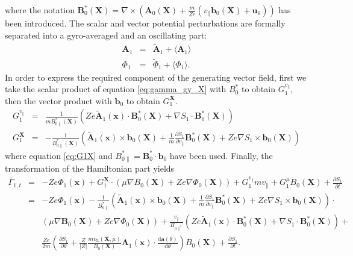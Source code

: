 \documentclass[a4paper,10pt]{article}
\newcommand{\st}[1]{\mathrm{#1}} %
\renewcommand{\vec}[1]{\mathbf{#1}}
\begin{document}
where the notation $\mathbf{B}_0^{*}(\mathbf{X}) = \nabla \times \left( \mathbf{A}_0(\mathbf{X}) + \frac{m}{Z e} (v_{\parallel} \mathbf{b}_0(\mathbf{X})+\vec{u}_0)\right)$ has been introduced. The scalar and vector potential perturbations are formally separated into a gyro-averaged and an oscillating part:
\begin{eqnarray}
	\mathbf{A}_1 &=& \widetilde{\vec{A}}_1 + \langle \mathbf{A}_1 \rangle \\
	\Phi_1 &=& \widetilde{\Phi}_1 + \langle \Phi_1 \rangle. \label{eq:av_osc_decomp_phi}
\end{eqnarray}
In order to express the required component of the generating vector field, first we take the scalar product of equation \ref{eq:gamma_gy_X} with $B_0^{*}$ to obtain $G_1^{v_{\parallel}}$, then the vector product with $\mathbf{b}_0$ to obtain $G_1^{\mathbf{X}}$.
\begin{eqnarray}
	G_1^{v_{\parallel}} &=& \frac{1}{m B_{0 \parallel}^{*}(\mathbf{X})} \left( Z e \widetilde{\vec{A}}_1(\vec{x}) \cdot \mathbf{B}_0^{*}(\mathbf{X}) + \nabla S_1 \cdot \mathbf{B}_0^{*}(\mathbf{X})\right) \\
	G_1^{\mathbf{X}} &=& -\frac{1}{B_{0 \parallel}^{*}(\mathbf{X})} \left( \widetilde{\vec{A}}_1(\vec{x}) \times \mathbf{b}_0(\mathbf{X}) + \frac{1}{m} \frac{\partial S_1}{\partial v_{\parallel}} \mathbf{B}_0^{*}(\mathbf{X}) + Z e \nabla S_1 \times \mathbf{b}_0(\mathbf{X}) \right)
\end{eqnarray}
where equation \ref{eq:G1X} and $B_{0 \parallel}^{*} = \mathbf{B}_0^{*} \cdot \mathbf{b}_0$ have been used. Finally, the transformation of the Hamiltonian part yields
\begin{eqnarray*}
	\bar{\Gamma}_{1,t} &=& -Z e \Phi_1(\mathbf{x}) + G_1^{\mathbf{X}} \cdot \left( \mu \nabla B_0(\mathbf{X}) + Z e \nabla \Phi_0(\mathbf{X}) \right) + G_1^{v_{\parallel}} m v_{\parallel} + G_1^{\mu} B_0(\mathbf{X}) + \frac{\partial S_1}{\partial t} \\
	&=& -Z e \Phi_1(\mathbf{x}) - \frac{1}{B_{0 \parallel}^{*}} \left( \widetilde{\vec{A}}_1(\vec{x}) \times \mathbf{b}_0(\mathbf{X}) + \frac{1}{m} \frac{\partial S_1}{\partial v_{\parallel}} \mathbf{B}_0^{*}(\mathbf{X}) + Z e \nabla S_1 \times \mathbf{b}_0(\mathbf{X}) \right) \cdot \\
	&& \left( \mu \nabla \mathbf{B}_0(\mathbf{X}) + Z e \nabla \Phi_0(\mathbf{X}) \right) + \frac{v_{\parallel}}{B_{0 \parallel^{*}}} \left( Z e \widetilde{\vec{A}}_1(\vec{x}) \cdot \mathbf{B}_0^{*}(\mathbf{X}) + \nabla S_1 \cdot \mathbf{B}_0^{*}(\mathbf{X})\right) + \\
	&& \frac{Z e}{2 m} \left( \frac{\partial S_1}{\partial \theta} + \frac{Z}{|Z|} \frac{m v_{\st{L}}(\mathbf{X},\mu)}{B_0(\mathbf{X})} \mathbf{A}_1(\mathbf{x}) \cdot \frac{\mathrm{d}\mathbf{a}(\theta)}{\mathrm{d} \theta} \right) B_0(\mathbf{X}) + \frac{\partial S_1}{\partial t}.
\end{eqnarray*}
\end{document}
